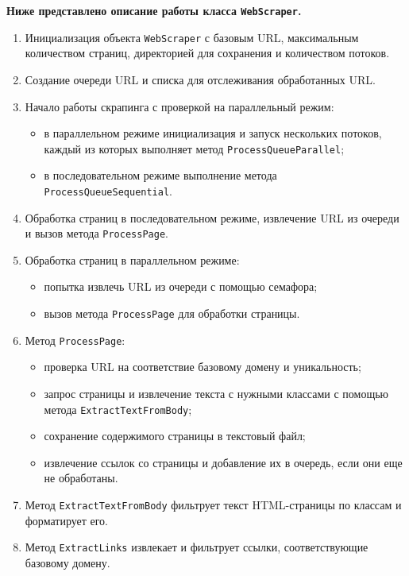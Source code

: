 \textbf{Ниже представлено описание работы класса \texttt{WebScraper}.}
\begin{enumerate}
    \item Инициализация объекта \texttt{WebScraper} с базовым URL, максимальным количеством страниц, директорией для сохранения и количеством потоков.
    \item Создание очереди URL и списка для отслеживания обработанных URL.
    \item Начало работы скрапинга с проверкой на параллельный режим:
    \begin{itemize}
        \item в параллельном режиме инициализация и запуск нескольких потоков, каждый из которых выполняет метод \texttt{ProcessQueueParallel};
        \item в последовательном режиме выполнение метода \texttt{ProcessQueueSequential}.
    \end{itemize}
    \item Обработка страниц в последовательном режиме, извлечение URL из очереди и вызов метода \texttt{ProcessPage}.
    \item Обработка страниц в параллельном режиме:
    \begin{itemize}
        \item попытка извлечь URL из очереди с помощью семафора;
        \item вызов метода \texttt{ProcessPage} для обработки страницы.
    \end{itemize}
    \item Метод \texttt{ProcessPage}:
    \begin{itemize}
        \item проверка URL на соответствие базовому домену и уникальность;
        \item запрос страницы и извлечение текста с нужными классами с помощью метода \texttt{ExtractTextFromBody};
        \item сохранение содержимого страницы в текстовый файл;
        \item извлечение ссылок со страницы и добавление их в очередь, если они еще не обработаны.
    \end{itemize}
    \item Метод \texttt{ExtractTextFromBody} фильтрует текст HTML-страницы по классам и форматирует его.
    \item Метод \texttt{ExtractLinks} извлекает и фильтрует ссылки, соответствующие базовому домену.
\end{enumerate}

